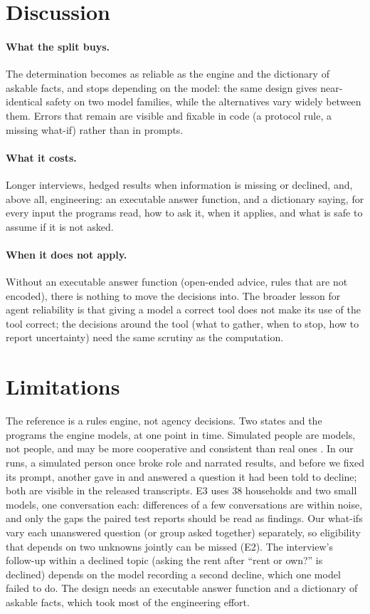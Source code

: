\documentclass[11pt]{article}
\begin{document}
\section{Discussion}
\paragraph{What the split buys.} The determination becomes as reliable as the engine and the dictionary of askable facts, and stops depending on the model: the same design gives near-identical safety on two model families, while the alternatives vary widely between them. Errors that remain are visible and fixable in code (a protocol rule, a missing what-if) rather than in prompts. \paragraph{What it costs.} Longer interviews, hedged results when information is missing or declined, and, above all, engineering: an executable answer function, and a dictionary saying, for every input the programs read, how to ask it, when it applies, and what is safe to assume if it is not asked. \paragraph{When it does not apply.} Without an executable answer function (open-ended advice, rules that are not encoded), there is nothing to move the decisions into. The broader lesson for agent reliability is that giving a model a correct tool does not make its use of the tool correct; the decisions around the tool (what to gather, when to stop, how to report uncertainty) need the same scrutiny as the computation.

\section{Limitations}
The reference is a rules engine, not agency decisions. Two states and the programs the engine models, at one point in time. Simulated people are models, not people, and may be more cooperative and consistent than real ones \citep{naous2025userlm}. In our runs, a simulated person once broke role and narrated results, and before we fixed its prompt, another gave in and answered a question it had been told to decline; both are visible in the released transcripts. E3 uses 38 households and two small models, one conversation each: differences of a few conversations are within noise, and only the gaps the paired test reports should be read as findings. Our what-ifs vary each unanswered question (or group asked together) separately, so eligibility that depends on two unknowns jointly can be missed (E2). The interview's follow-up within a declined topic (asking the rent after ``rent or own?'' is declined) depends on the model recording a second decline, which one model failed to do. The design needs an executable answer function and a dictionary of askable facts, which took most of the engineering effort.
\end{document}
